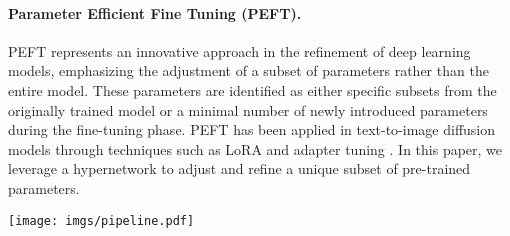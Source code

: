 



\paragraph{\textbf{Parameter Efficient Fine Tuning (PEFT).}} PEFT represents an innovative approach in the refinement of deep learning models, emphasizing the adjustment of a subset of parameters rather than the entire model. These parameters are identified as either specific subsets from the originally trained model or a minimal number of newly introduced parameters during the fine-tuning phase. PEFT has been applied in text-to-image diffusion models \cite{saharia2022photorealistic,rombach2022high} through techniques such as LoRA \cite{ryu2023low} and adapter tuning \cite{mou2023t2i,ye2023ip,wei2023elite,chen2024subject,ma2023unified}. In this paper, we leverage a hypernetwork to adjust and refine a unique subset of pre-trained parameters.

\begin{figure*}[t]
    \centering
    \texttt{[image: imgs/pipeline.pdf]}
    \caption{The SigStyle framework. First, given a style image, we perform hypernetwork-powered style-aware fine-tuning for style inversion and represent the reference style as a special token * (see Figure \ref{fig:method}.a). In Figure \ref{fig:method}.b, the upper branch represents the reconstruction process of the content image, while the lower branch represents the generation process of the target image. When generating the target image using a pre-trained model and target text, we first use DDIM Inversion to map the content image into noise latents, which are then copied as the initial noise for generating the target image. Then, we adopt time-aware attention swapping to inject structural and content information during the first $k$ steps of the denoising process (see Figure b). In the subsequent $T-k$ steps, we proceed with the usual denoising process without any swapping. Finally, by decoding with VAE, we obtain the style-transferred image. }
    \label{fig:method}
\end{figure*}